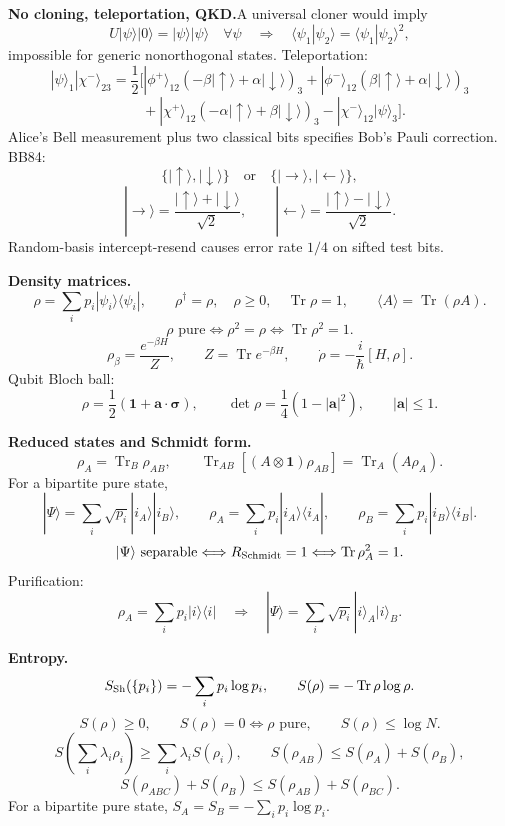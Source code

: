 \noindent\textbf{No cloning, teleportation, QKD.}\quad A universal cloner would imply
\[
U|\psi\rangle|0\rangle=|\psi\rangle|\psi\rangle\quad\forall\psi
\quad\Longrightarrow\quad
\langle\psi_1|\psi_2\rangle=\langle\psi_1|\psi_2\rangle^2,
\]
impossible for generic nonorthogonal states.
Teleportation:
\[
|\psi\rangle_1|\chi^-\rangle_{23}
=\frac12\Big[
|\phi^+\rangle_{12}(-\beta|\uparrow\rangle+\alpha|\downarrow\rangle)_3
+|\phi^-\rangle_{12}(\beta|\uparrow\rangle+\alpha|\downarrow\rangle)_3
\]
\[
\qquad
+|\chi^+\rangle_{12}(-\alpha|\uparrow\rangle+\beta|\downarrow\rangle)_3
-|\chi^-\rangle_{12}|\psi\rangle_3\Big].
\]
Alice's Bell measurement plus two classical bits specifies Bob's Pauli correction.
BB84:
\[
\{|\uparrow\rangle,|\downarrow\rangle\}\quad\text{or}\quad
\{|\rightarrow\rangle,|\leftarrow\rangle\},
\]
\[
|\rightarrow\rangle=\frac{|\uparrow\rangle+|\downarrow\rangle}{\sqrt2},\qquad
|\leftarrow\rangle=\frac{|\uparrow\rangle-|\downarrow\rangle}{\sqrt2}.
\]
Random-basis intercept-resend causes error rate $1/4$ on sifted test bits.

\noindent\textbf{Density matrices.}\quad
\[
\rho=\sum_ip_i|\psi_i\rangle\langle\psi_i|,\qquad
\rho^\dagger=\rho,\quad \rho\ge0,\quad \operatorname{Tr}\rho=1,
\qquad \langle A\rangle=\operatorname{Tr}(\rho A).
\]
\[
\rho\text{ pure}\Longleftrightarrow \rho^2=\rho
\Longleftrightarrow \operatorname{Tr}\rho^2=1.
\]
\[
\rho_\beta=\frac{e^{-\beta H}}{Z},\qquad
Z=\operatorname{Tr}e^{-\beta H},\qquad
\dot\rho=-\frac{i}{\hbar}[H,\rho].
\]
Qubit Bloch ball:
\[
\rho=\frac12(\mathbf{1}+\mathbf a\cdot\bm{\sigma}),\qquad
\det\rho=\frac14(1-|\mathbf a|^2),\qquad |\mathbf a|\le1.
\]

\noindent\textbf{Reduced states and Schmidt form.}\quad
\[
\rho_A=\operatorname{Tr}_B\rho_{AB},\qquad
\operatorname{Tr}_{AB}[(A\otimes\mathbf{1})\rho_{AB}]
=\operatorname{Tr}_A(A\rho_A).
\]
For a bipartite pure state,
\[
|\Psi\rangle=\sum_i\sqrt{p_i}|i_A\rangle|i_B\rangle,\qquad
\rho_A=\sum_ip_i|i_A\rangle\langle i_A|,\qquad
\rho_B=\sum_ip_i|i_B\rangle\langle i_B|.
\]
\[
|\Psi\rangle\text{ separable}
\Longleftrightarrow R_{\rm Schmidt}=1
\Longleftrightarrow \operatorname{Tr}\rho_A^2=1.
\]
Purification:
\[
\rho_A=\sum_ip_i|i\rangle\langle i|
\quad\Longrightarrow\quad
|\Psi\rangle=\sum_i\sqrt{p_i}|i\rangle_A|i\rangle_B.
\]

\noindent\textbf{Entropy.}\quad
\[
S_{\rm Sh}(\{p_i\})=-\sum_ip_i\log p_i,\qquad
S(\rho)=-\operatorname{Tr}\rho\log\rho.
\]
\[
S(\rho)\ge0,\qquad S(\rho)=0\Longleftrightarrow \rho\text{ pure},\qquad
S(\rho)\le\log N.
\]
\[
S\left(\sum_i\lambda_i\rho_i\right)\ge\sum_i\lambda_iS(\rho_i),\qquad
S(\rho_{AB})\le S(\rho_A)+S(\rho_B),
\]
\[
S(\rho_{ABC})+S(\rho_B)\le S(\rho_{AB})+S(\rho_{BC}).
\]
For a bipartite pure state, $S_A=S_B=-\sum_ip_i\log p_i$.

